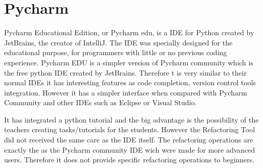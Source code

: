 \section{Pycharm}
Pycharm Educational Edition, or Pycharm edu, is a IDE for Python created by JetBrains,
the creator of IntelliJ.
The IDE was specially designed for the educational purpose, for programmers
with little or no previous coding experience.
Pycharm EDU is a simpler version of Pycharm community which is the free
python IDE created by JetBrains.
Therefore t is very similar to their normal IDEs it has interesting features
as code completion, version control tools integration.
However it has a simpler interface when compared with
Pycharm Community and other IDEs such as Eclipse or Visual Studio. %

It has integrated a python tutorial and the big advantage is the possibility of
the teachers creating tasks/tutorials for the students.
However the Refactoring Tool did not received the same care as the IDE itself.
The refactoring operations are exactly the as the Pycharm community IDE wich were made
for more advanced users.
Therefore it does not provide specific refactoring operations to beginners.



